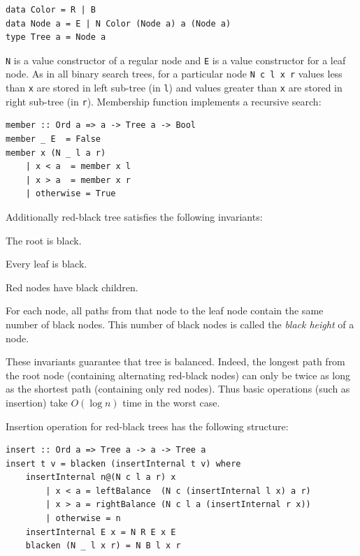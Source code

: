 \documentclass{tmr}
\newcommand{\italic}[1]{\textit{#1}}
\begin{document}
\begin{Verbatim}
data Color = R | B
data Node a = E | N Color (Node a) a (Node a) 
type Tree a = Node a
\end{Verbatim}

\verb|N| is a value constructor of a regular node and \verb|E| is a value constructor for a leaf node. As in all binary search trees, for a particular node \verb|N c l x r| values less than \verb|x| are stored in left sub-tree (in \verb|l|) and values greater than \verb|x| are stored in right sub-tree (in \verb|r|). Membership function implements a recursive search:

\begin{Verbatim}
member :: Ord a => a -> Tree a -> Bool
member _ E  = False
member x (N _ l a r)
    | x < a  = member x l
    | x > a  = member x r
    | otherwise = True
\end{Verbatim}

Additionally red-black tree satisfies the following invariants:

\begin{longenum}
\item The root is black.
\item Every leaf is black. %
\item Red nodes have black children.
\item For each node, all paths from that node to the leaf node contain the same number of black nodes. This number of black nodes is called the \italic{black height} of a node.
\end{longenum}


These invariants guarantee that tree is balanced. Indeed, the longest path from the root node (containing alternating red-black nodes) can only be twice as long as the shortest path (containing only red nodes). Thus basic operations (such as insertion) take $O(\log n)$ time in the worst case.

Insertion operation for red-black trees has the following structure:

\begin{Verbatim}
insert :: Ord a => Tree a -> a -> Tree a
insert t v = blacken (insertInternal t v) where
    insertInternal n@(N c l a r) x
        | x < a = leftBalance  (N c (insertInternal l x) a r)
        | x > a = rightBalance (N c l a (insertInternal r x))
        | otherwise = n
    insertInternal E x = N R E x E
    blacken (N _ l x r) = N B l x r
\end{Verbatim}
\end{document}
